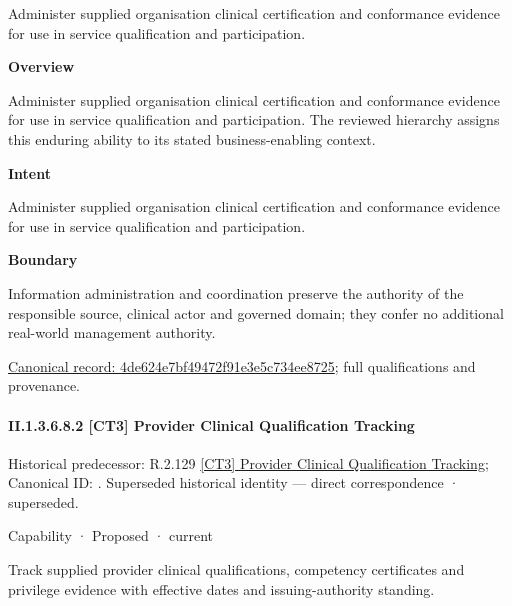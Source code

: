 Administer supplied organisation clinical certification and conformance evidence for use in service qualification and participation.



\textbf{Overview}



Administer supplied organisation clinical certification and conformance evidence for use in service qualification and participation. The reviewed hierarchy assigns this enduring ability to its stated business-enabling context.



\textbf{Intent}



Administer supplied organisation clinical certification and conformance evidence for use in service qualification and participation.



\textbf{Boundary}



Information administration and coordination preserve the authority of the responsible source, clinical actor and governed domain; they confer no additional real-world management authority.


{\footnotesize \href{../../../../continuum/strategy/capability/4de624e7bf49472f91e3e5c734ee8725.md}{Canonical record: 4de624e7bf49472f91e3e5c734ee8725}; full qualifications and provenance.}\par
\paragraph*{II.1.3.6.8.2 [CT3] Provider Clinical Qualification Tracking}
\label{navigation:II.1.3.6.8.2}

{\small Historical predecessor: R.2.129 \hyperref[element:ab0415e2ea0a4da4ad3dc46997d48bc3]{[CT3] Provider Clinical Qualification Tracking}; Canonical ID: \texttt{}. Superseded historical identity — direct correspondence · superseded.}\par
\label{element:8fd5c78eba3046fa9153fb4efb44e9c8}
{\small Capability · Proposed · current}\par

Track supplied provider clinical qualifications, competency certificates and privilege evidence with effective dates and issuing-authority standing.




